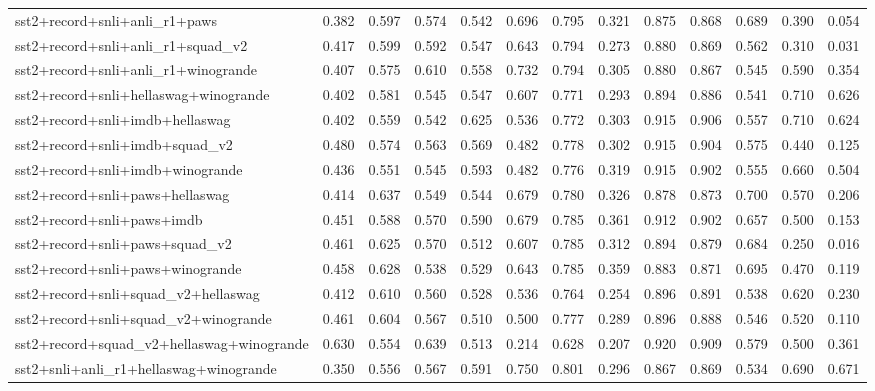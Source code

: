 \begin{table}[t]
\begin{tabular}{lrrrrrrrrrrrr}
    sst2+record+snli+anli\_r1+paws & 0.382 & 0.597 & 0.574 & 0.542 & 0.696 & 0.795 & 0.321 & 0.875 & 0.868 & 0.689 & 0.390 & 0.054 \\
    sst2+record+snli+anli\_r1+squad\_v2 & 0.417 & 0.599 & 0.592 & 0.547 & 0.643 & 0.794 & 0.273 & 0.880 & 0.869 & 0.562 & 0.310 & 0.031 \\
    sst2+record+snli+anli\_r1+winogrande & 0.407 & 0.575 & 0.610 & 0.558 & 0.732 & 0.794 & 0.305 & 0.880 & 0.867 & 0.545 & 0.590 & 0.354 \\
    sst2+record+snli+hellaswag+winogrande & 0.402 & 0.581 & 0.545 & 0.547 & 0.607 & 0.771 & 0.293 & 0.894 & 0.886 & 0.541 & 0.710 & 0.626 \\
    sst2+record+snli+imdb+hellaswag & 0.402 & 0.559 & 0.542 & 0.625 & 0.536 & 0.772 & 0.303 & 0.915 & 0.906 & 0.557 & 0.710 & 0.624 \\
    sst2+record+snli+imdb+squad\_v2 & 0.480 & 0.574 & 0.563 & 0.569 & 0.482 & 0.778 & 0.302 & 0.915 & 0.904 & 0.575 & 0.440 & 0.125 \\
    sst2+record+snli+imdb+winogrande & 0.436 & 0.551 & 0.545 & 0.593 & 0.482 & 0.776 & 0.319 & 0.915 & 0.902 & 0.555 & 0.660 & 0.504 \\
    sst2+record+snli+paws+hellaswag & 0.414 & 0.637 & 0.549 & 0.544 & 0.679 & 0.780 & 0.326 & 0.878 & 0.873 & 0.700 & 0.570 & 0.206 \\
    sst2+record+snli+paws+imdb & 0.451 & 0.588 & 0.570 & 0.590 & 0.679 & 0.785 & 0.361 & 0.912 & 0.902 & 0.657 & 0.500 & 0.153 \\
    sst2+record+snli+paws+squad\_v2 & 0.461 & 0.625 & 0.570 & 0.512 & 0.607 & 0.785 & 0.312 & 0.894 & 0.879 & 0.684 & 0.250 & 0.016 \\
    sst2+record+snli+paws+winogrande & 0.458 & 0.628 & 0.538 & 0.529 & 0.643 & 0.785 & 0.359 & 0.883 & 0.871 & 0.695 & 0.470 & 0.119 \\
    sst2+record+snli+squad\_v2+hellaswag & 0.412 & 0.610 & 0.560 & 0.528 & 0.536 & 0.764 & 0.254 & 0.896 & 0.891 & 0.538 & 0.620 & 0.230 \\
    sst2+record+snli+squad\_v2+winogrande & 0.461 & 0.604 & 0.567 & 0.510 & 0.500 & 0.777 & 0.289 & 0.896 & 0.888 & 0.546 & 0.520 & 0.110 \\
    sst2+record+squad\_v2+hellaswag+winogrande & 0.630 & 0.554 & 0.639 & 0.513 & 0.214 & 0.628 & 0.207 & 0.920 & 0.909 & 0.579 & 0.500 & 0.361 \\
    sst2+snli+anli\_r1+hellaswag+winogrande & 0.350 & 0.556 & 0.567 & 0.591 & 0.750 & 0.801 & 0.296 & 0.867 & 0.869 & 0.534 & 0.690 & 0.671 \\

\end{tabular}
\end{table}
